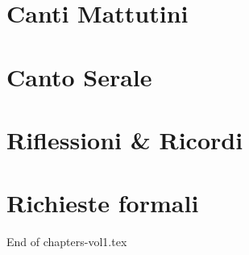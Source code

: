

\morningPartSettings

\part{Canti Mattutini}

\morningChapterSettings



\morningSettingsRestore

\eveningPartSettings

\part{Canto Serale}

\eveningChapterSettings



\eveningSettingsRestore


\part{Riflessioni \& Ricordi}







\requestsPartSettings

 \part{Richieste formali}

\requestsChapterSettings

 

 \requestsSettingsRestore

 End of chapters-vol1.tex
